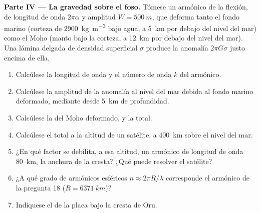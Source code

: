 \begin{problem}
\noindent\textbf{Parte IV --- La gravedad sobre el foso.} Tómese un armónico de la
flexión, de longitud de onda $2\pi\alpha$ y amplitud $W = \qty{500}{m}$, que deforma
tanto el fondo marino (corteza de \qty{2900}{kg.m^{-3}} bajo agua, a \qty{5}{km} por debajo del
nivel del mar) como el Moho (manto bajo la corteza, a \qty{12}{km} por debajo del nivel del mar). Una
lámina delgada de densidad superficial $\sigma$ produce la anomalía $2\pi G\sigma$
justo encima de ella.
\begin{enumerate}[resume]
  \item Calcúlese la longitud de onda y el número de onda $k$ del armónico.
  \item Calcúlese la amplitud de la anomalía al nivel del mar debida al fondo marino deformado,
        mediante  desde \qty{5}{km} de profundidad.
  \item Calcúlese la del Moho deformado, y la total.
  \item Calcúlese el total a la altitud de un satélite, a \qty{400}{km} sobre el nivel del
        mar.
  \item ¿En qué factor se debilita, a esa altitud, un armónico de longitud de onda \qty{80}{km}, la anchura de
        la cresta? ¿Qué puede resolver el satélite?
  \item ¿A qué grado de armónicos esféricos $n \approx 2\pi R/\lambda$ corresponde el
        armónico de la pregunta 18 ($R = \qty{6371}{km}$)?
  \item Indíquese el  de la placa bajo la cresta de
        Oru.
\end{enumerate}
\end{problem}
